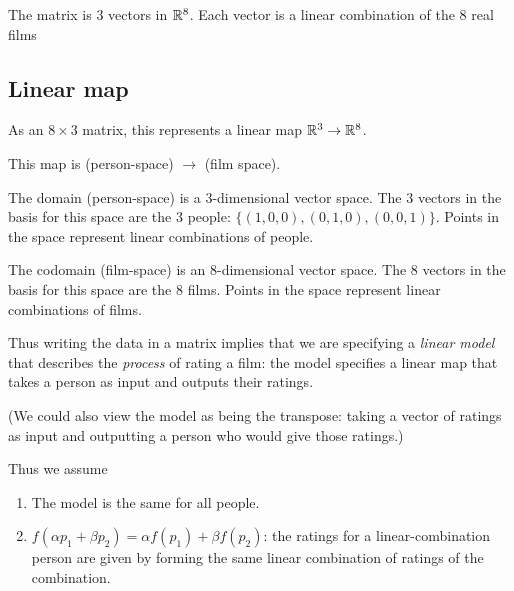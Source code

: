 \newpage
The matrix is 3 vectors in $\mathbb{R}^8$. Each vector is a linear combination of the 8 real films

\subsection*{Linear map}

As an $8 \times 3$ matrix, this represents a linear map $\mathbb{R}^3 \to \mathbb{R}^8$.

This map is (person-space) $\to$ (film space).

The domain (person-space) is a 3-dimensional vector space. The 3 vectors in the basis for this
space are the 3 people: $\{(1, 0, 0), (0, 1, 0), (0, 0, 1)\}$. Points in the space represent linear
combinations of people.

The codomain (film-space) is an 8-dimensional vector space. The 8 vectors in the basis for this
space are the 8 films. Points in the space represent linear combinations of films.

Thus writing the data in a matrix implies that we are specifying a {\it linear model} that
describes the {\it process} of rating a film: the model specifies a linear map that takes a person
as input and outputs their ratings.

(We could also view the model as being the transpose: taking a vector of ratings as input and
outputting a person who would give those ratings.)

Thus we assume
\begin{enumerate}
\item The model is the same for all people.
\item $f(\alpha p_1 + \beta p_2) = \alpha f(p_1) + \beta f(p_2)$: the ratings for a
  linear-combination person are given by forming the same linear combination of ratings of the
 combination.
\end{enumerate}
